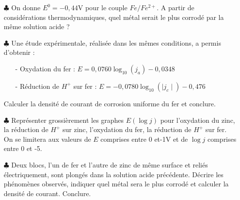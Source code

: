 \documentclass{report}
\begin{document}
\begin{itemize}
	
		\item[$\clubsuit$] On donne $E^0=-0,44$V pour le couple $Fe/Fe^{2+}$. A partir de considérations thermodynamiques, quel métal serait le plus corrodé par la même solution acide ?
		
	\item[$\clubsuit$] Une étude expérimentale, réalisée dans les mêmes conditions, a permis d'obtenir :
	\begin{itemize}
		\item[-] Oxydation du fer : $E=0,0760\log_{10}(j_a)-0,0348$
		\item[-] Réduction de $H^+$ sur fer : $E=-0,0780\log_{10}(\mid j_c\mid)-0,476$
	\end{itemize}
	Calculer la densité de courant de corrosion uniforme du fer et conclure.
		
	\item[$\clubsuit$] Représenter grossièrement les graphes $E(\log j)$ pour l'oxydation du zinc, la réduction de $H^+$ sur zinc, l'oxydation du fer, la réduction de $H^+$ sur fer. On se limitera aux valeurs de $E$ comprises entre 0 et-1V et de $\log j$ comprises entre 0 et -5.
	
	\item[$\clubsuit$] Deux blocs, l'un de fer et l'autre de zinc de même surface et reliés électriquement, sont plongés dans la solution acide précédente. Décrire les phénomènes observés, indiquer quel métal sera le plus corrodé et calculer la densité de courant. Conclure. 
	
\end{itemize}
\end{document}
